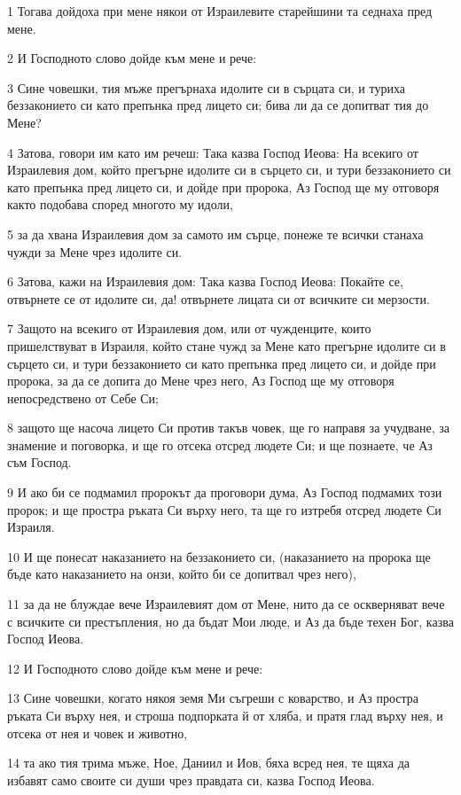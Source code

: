 \par 1 Тогава дойдоха при мене някои от Израилевите старейшини та седнаха пред мене.
\par 2 И Господното слово дойде към мене и рече:
\par 3 Сине човешки, тия мъже прегърнаха идолите си в сърцата си, и туриха беззаконието си като препънка пред лицето си; бива ли да се допитват тия до Мене?
\par 4 Затова, говори им като им речеш: Така казва Господ Иеова: На всекиго от Израилевия дом, който прегърне идолите си в сърцето си, и тури беззаконието си като препънка пред лицето си, и дойде при пророка, Аз Господ ще му отговоря както подобава според многото му идоли,
\par 5 за да хвана Израилевия дом за самото им сърце, понеже те всички станаха чужди за Мене чрез идолите си.
\par 6 Затова, кажи на Израилевия дом: Така казва Господ Иеова: Покайте се, отвърнете се от идолите си, да! отвърнете лицата си от всичките си мерзости.
\par 7 Защото на всекиго от Израилевия дом, или от чужденците, които пришелствуват в Израиля, който стане чужд за Мене като прегърне идолите си в сърцето си, и тури беззаконието си като препънка пред лицето си, и дойде при пророка, за да се допита до Мене чрез него, Аз Господ ще му отговоря непосредствено от Себе Си;
\par 8 защото ще насоча лицето Си против такъв човек, ще го направя за учудване, за знамение и поговорка, и ще го отсека отсред людете Си; и ще познаете, че Аз съм Господ.
\par 9 И ако би се подмамил пророкът да проговори дума, Аз Господ подмамих този пророк; и ще простра ръката Си върху него, та ще го изтребя отсред людете Си Израиля.
\par 10 И ще понесат наказанието на беззаконието си, (наказанието на пророка ще бъде като наказанието на онзи, който би се допитвал чрез него),
\par 11 за да не блуждае вече Израилевият дом от Мене, нито да се оскверняват вече с всичките си престъпления, но да бъдат Мои люде, и Аз да бъде техен Бог, казва Господ Иеова.
\par 12 И Господното слово дойде към мене и рече:
\par 13 Сине човешки, когато някоя земя Ми съгреши с коварство, и Аз простра ръката Си върху нея, и строша подпорката й от хляба, и пратя глад върху нея, и отсека от нея и човек и животно,
\par 14 та ако тия трима мъже, Ное, Даниил и Иов, бяха всред нея, те щяха да избавят само своите си души чрез правдата си, казва Господ Иеова.
